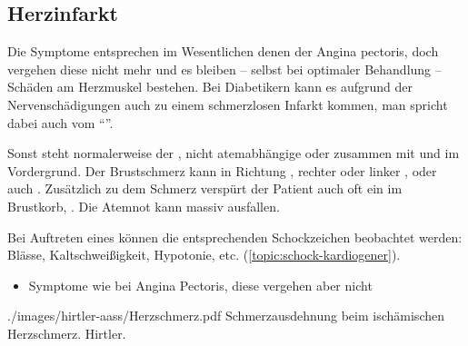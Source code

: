 \subsection{Herzinfarkt}
\label{topic:herzinfarkt}
\label{topic:myocardinfarkt}
\label{topic:mci}



{%
Die Symptome entsprechen im Wesentlichen denen der Angina
pectoris, doch vergehen diese nicht mehr und es bleiben --
selbst bei optimaler Behandlung -- Schäden am Herzmuskel
bestehen. Bei Diabetikern kann es aufgrund der
Nervenschädigungen auch zu einem schmerzlosen Infarkt
kommen, man spricht dabei auch vom \enquote{}.

Sonst steht normalerweise der , nicht
atemabhängige  oder
 zusammen mit  und
 im Vordergrund. Der Brustschmerz kann in Richtung , rechter oder linker ,
 oder auch  . Zusätzlich
zu dem Schmerz verspürt der Patient auch oft ein  im
Brustkorb, . Die Atemnot kann massiv ausfallen.

Bei Auftreten eines  können die entsprechenden Schockzeichen beobachtet
werden: Blässe, Kaltschweißigkeit, Hypotonie, etc.
(\ref{topic:schock-kardiogener}).
}{
\begin{itemize}
  \item Symptome wie bei Angina Pectoris, diese vergehen aber nicht
\end{itemize}
}
{./images/hirtler-aass/Herzschmerz.pdf}
{Schmerzausdehnung beim ischämischen
Herzschmerz.}
{Hirtler.}
  
